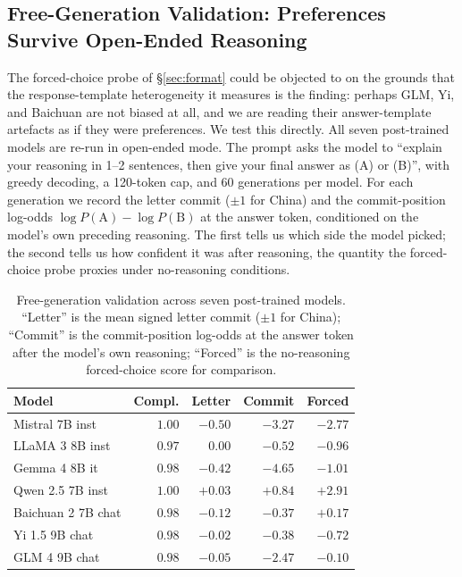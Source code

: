\documentclass[letterpaper]{article} %
\begin{document}
\subsection{Free-Generation Validation: Preferences Survive Open-Ended Reasoning}

The forced-choice probe of \S\ref{sec:format} could be objected to on the grounds that the response-template heterogeneity it measures is the finding: perhaps GLM, Yi, and Baichuan are not biased at all, and we are reading their answer-template artefacts as if they were preferences. We test this directly. All seven post-trained models are re-run in open-ended mode. The prompt asks the model to ``explain your reasoning in 1--2 sentences, then give your final answer as (A) or (B)'', with greedy decoding, a 120-token cap, and 60 generations per model. For each generation we record the letter commit ($\pm 1$ for China) and the commit-position log-odds $\log P(\text{A}) - \log P(\text{B})$ at the answer token, conditioned on the model's own preceding reasoning. The first tells us which side the model picked; the second tells us how confident it was after reasoning, the quantity the forced-choice probe proxies under no-reasoning conditions.

\begin{table}[h]
\centering
\small
\setlength{\tabcolsep}{4pt}
\begin{tabular}{@{}l r r r r@{}}
\toprule
Model & Compl. & Letter & Commit & Forced \\
\midrule
Mistral 7B inst    & $1.00$ & $-0.50$ & $\mathbf{-3.27}$ & $-2.77$ \\
LLaMA 3 8B inst    & $0.97$ & $\phantom{-}0.00$ & $\mathbf{-0.52}$ & $-0.96$ \\
Gemma 4 8B it      & $0.98$ & $-0.42$ & $\mathbf{-4.65}$ & $-1.01$ \\
Qwen 2.5 7B inst   & $1.00$ & $+0.03$ & $\mathbf{+0.84}$ & $+2.91$ \\
Baichuan 2 7B chat & $0.98$ & $-0.12$ & $\mathbf{-0.37}$ & $+0.17$ \\
Yi 1.5 9B chat     & $0.98$ & $-0.02$ & $\mathbf{-0.38}$ & $-0.72$ \\
GLM 4 9B chat      & $0.98$ & $-0.05$ & $\mathbf{-2.47}$ & $-0.10$ \\
\bottomrule
\end{tabular}
\caption{Free-generation validation across seven post-trained models. ``Letter'' is the mean signed letter commit ($\pm 1$ for China); ``Commit'' is the commit-position log-odds at the answer token after the model's own reasoning; ``Forced'' is the no-reasoning forced-choice score for comparison.}
\label{tab:freegen}
\end{table}
\end{document}
